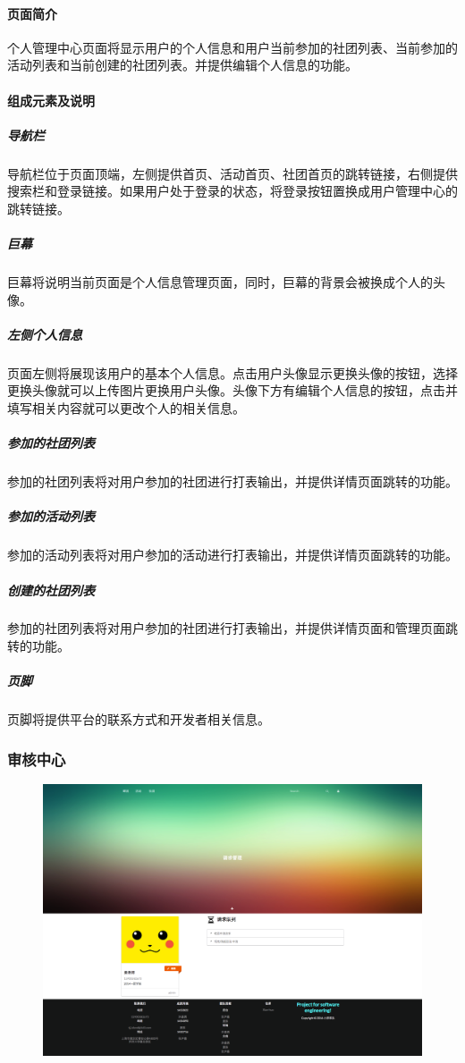 \documentclass[UTF8]{ctexart}
\begin{document}
\paragraph{页面简介}
个人管理中心页面将显示用户的个人信息和用户当前参加的社团列表、当前参加的活动列表和当前创建的社团列表。并提供编辑个人信息的功能。

\paragraph{组成元素及说明}
\subparagraph*{导航栏}
导航栏位于页面顶端，左侧提供首页、活动首页、社团首页的跳转链接，右侧提供搜索栏和登录链接。如果用户处于登录的状态，将登录按钮置换成用户管理中心的跳转链接。
\subparagraph*{巨幕}
巨幕将说明当前页面是个人信息管理页面，同时，巨幕的背景会被换成个人的头像。
\subparagraph*{左侧个人信息}
页面左侧将展现该用户的基本个人信息。点击用户头像显示更换头像的按钮，选择更换头像就可以上传图片更换用户头像。头像下方有编辑个人信息的按钮，点击并填写相关内容就可以更改个人的相关信息。
\subparagraph*{参加的社团列表}
参加的社团列表将对用户参加的社团进行打表输出，并提供详情页面跳转的功能。
\subparagraph*{参加的活动列表}
参加的活动列表将对用户参加的活动进行打表输出，并提供详情页面跳转的功能。
\subparagraph*{创建的社团列表}
参加的社团列表将对用户参加的社团进行打表输出，并提供详情页面和管理页面跳转的功能。
\subparagraph*{页脚}
页脚将提供平台的联系方式和开发者相关信息。

\subsubsection{审核中心}
\begin{figure}[H]
\centering
\includegraphics[width = .9\textwidth]{web-admin.png}
\end{figure}
\end{document}
